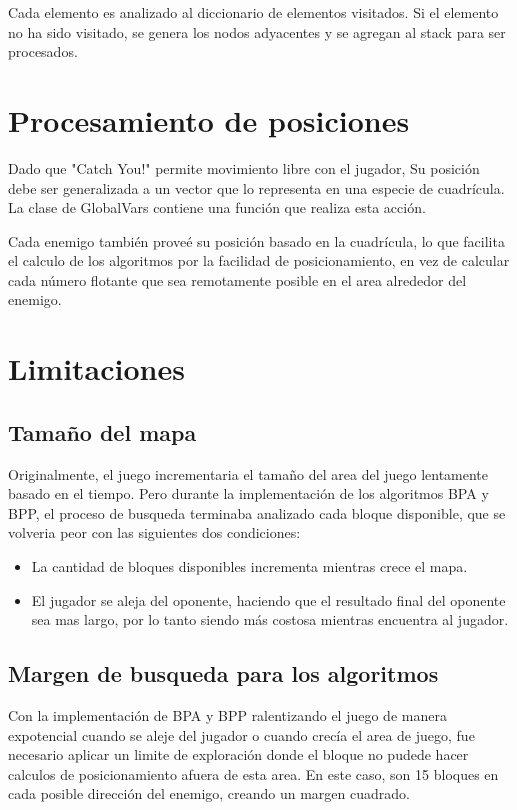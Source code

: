 \documentclass{article}
\begin{document}
Cada elemento es analizado al diccionario de elementos visitados. Si el elemento no ha sido visitado, se genera los nodos adyacentes y se agregan
al stack para ser procesados.



\section{Procesamiento de posiciones}

Dado que "Catch You!" permite movimiento libre con el jugador, Su posición debe ser generalizada a un vector que lo representa en una especie de cuadrícula.
La clase de GlobalVars contiene una función que realiza esta acción.



Cada enemigo también proveé su posición basado en la cuadrícula, lo que facilita el calculo de los algoritmos por la facilidad de posicionamiento, en vez de calcular
cada número flotante que sea remotamente posible en el area alrededor del enemigo.



\section{Limitaciones}

\subsection{Tamaño del mapa}

Originalmente, el juego incrementaria el tamaño del area del juego lentamente basado en el tiempo. Pero durante la
implementación de los algoritmos BPA y BPP, el proceso de busqueda terminaba analizado cada bloque disponible, que se volveria
peor con las siguientes dos condiciones:
\begin{itemize}
    \item La cantidad de bloques disponibles incrementa mientras crece el mapa.
    \item El jugador se aleja del oponente, haciendo que el resultado final del oponente sea mas largo, por lo tanto
    siendo más costosa mientras encuentra al jugador.
\end{itemize}

\subsection{Margen de busqueda para los algoritmos}

Con la implementación de BPA y BPP ralentizando el juego de manera expotencial cuando se aleje del jugador o cuando crecía el
area de juego, fue necesario aplicar un limite de exploración donde el bloque no pudede hacer calculos de posicionamiento
afuera de esta area. En este caso, son 15 bloques en cada posible dirección del enemigo, creando un margen cuadrado.


\end{document}
